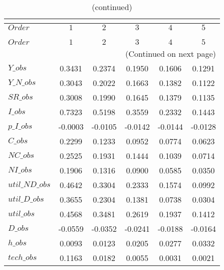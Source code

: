  
\begin{center}
\begin{longtable}{lccccc} 
\caption{COEFFICIENTS OF AUTOCORRELATION}\\
 \label{Table:th_autocorr_matrix}\\
\toprule 
$Order          $	 & 	 $          1$	 & 	 $          2$	 & 	 $          3$	 & 	 $          4$	 & 	 $          5$\\
\midrule \endfirsthead 
\caption{(continued)}\\
 \toprule \\ 
$Order          $	 & 	 $          1$	 & 	 $          2$	 & 	 $          3$	 & 	 $          4$	 & 	 $          5$\\
\midrule \endhead 
\midrule \multicolumn{6}{r}{(Continued on next page)} \\ \bottomrule \endfoot 
\bottomrule \endlastfoot 
$Y\_obs         $	 & 	     0.3431	 & 	     0.2374	 & 	     0.1950	 & 	     0.1606	 & 	     0.1291 \\ 
$Y\_N\_obs      $	 & 	     0.3043	 & 	     0.2022	 & 	     0.1663	 & 	     0.1382	 & 	     0.1122 \\ 
$SR\_obs        $	 & 	     0.3008	 & 	     0.1990	 & 	     0.1645	 & 	     0.1379	 & 	     0.1135 \\ 
$I\_obs         $	 & 	     0.7323	 & 	     0.5198	 & 	     0.3559	 & 	     0.2332	 & 	     0.1443 \\ 
$p\_I\_obs      $	 & 	    -0.0003	 & 	    -0.0105	 & 	    -0.0142	 & 	    -0.0144	 & 	    -0.0128 \\ 
$C\_obs         $	 & 	     0.2299	 & 	     0.1233	 & 	     0.0952	 & 	     0.0774	 & 	     0.0623 \\ 
$NC\_obs        $	 & 	     0.2525	 & 	     0.1931	 & 	     0.1444	 & 	     0.1039	 & 	     0.0714 \\ 
$NI\_obs        $	 & 	     0.1906	 & 	     0.1316	 & 	     0.0900	 & 	     0.0585	 & 	     0.0350 \\ 
$util\_ND\_obs  $	 & 	     0.4642	 & 	     0.3304	 & 	     0.2333	 & 	     0.1574	 & 	     0.0992 \\ 
$util\_D\_obs   $	 & 	     0.3655	 & 	     0.2304	 & 	     0.1381	 & 	     0.0738	 & 	     0.0304 \\ 
$util\_obs      $	 & 	     0.4568	 & 	     0.3481	 & 	     0.2619	 & 	     0.1937	 & 	     0.1412 \\ 
$D\_obs         $	 & 	    -0.0559	 & 	    -0.0352	 & 	    -0.0241	 & 	    -0.0188	 & 	    -0.0164 \\ 
$h\_obs         $	 & 	     0.0093	 & 	     0.0123	 & 	     0.0205	 & 	     0.0277	 & 	     0.0332 \\ 
$tech\_obs      $	 & 	     0.1163	 & 	     0.0182	 & 	     0.0055	 & 	     0.0031	 & 	     0.0021 \\ 
\end{longtable}
 \end{center}
